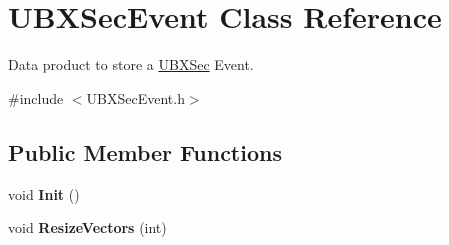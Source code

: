 \hypertarget{classUBXSecEvent}{\section{U\-B\-X\-Sec\-Event Class Reference}
\label{classUBXSecEvent}
}


Data product to store a \hyperlink{classUBXSec}{U\-B\-X\-Sec} Event.  




{\ttfamily \#include $<$U\-B\-X\-Sec\-Event.\-h$>$}

\subsection*{Public Member Functions}
\begin{DoxyCompactItemize}
\item 
\hypertarget{classUBXSecEvent_a57603c847176b408838d04e690b04828}{void {\bfseries Init} ()}\label{classUBXSecEvent_a57603c847176b408838d04e690b04828}

\item 
\hypertarget{classUBXSecEvent_a87228eb442b415053b9a9a070d29790b}{void {\bfseries Resize\-Vectors} (int)}\label{classUBXSecEvent_a87228eb442b415053b9a9a070d29790b}

\end{DoxyCompactItemize}
